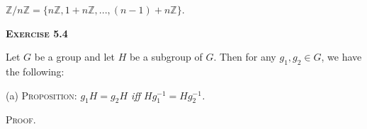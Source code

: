 \documentclass[12pt, a4paper]{article}
\begin{document}
\vspace{6mm}

\centerline{$\mathbb{Z}/n\mathbb{Z}=\{n\mathbb{Z}, 1+n\mathbb{Z}, ... , (n-1)+n\mathbb{Z}\}$.}

\vspace{4mm}

\begin{flushleft}
\textsc{\textbf{Exercise 5.4}}
\end{flushleft}

\vspace{2mm}

Let $G$ be a group and let $H$ be a subgroup of $G$. Then for any $g_1,g_2\in G$, we have the following:\par

\vspace{6mm}

\begin{list}
\item{(a) \textsc{Proposition:} \textit{$g_1H=g_2H$ iff $Hg^{-1}_1=Hg^{-1}_2$.}}
\end{list}

\vspace{2mm}

\textsc{Proof.}

\vspace{4mm}
\end{document}
